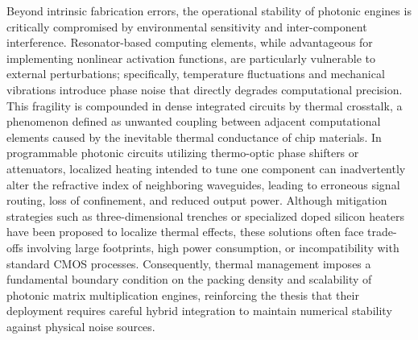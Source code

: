 Beyond intrinsic fabrication errors, the operational stability of photonic engines is critically compromised by environmental sensitivity and inter-component interference. Resonator-based computing elements, while advantageous for implementing nonlinear activation functions, are particularly vulnerable to external perturbations; specifically, temperature fluctuations and mechanical vibrations introduce phase noise that directly degrades computational precision. This fragility is compounded in dense integrated circuits by thermal crosstalk, a phenomenon defined as unwanted coupling between adjacent computational elements caused by the inevitable thermal conductance of chip materials. \citep{doi_10_1109_access_2020_3013116_8fec1fb2} In programmable photonic circuits utilizing thermo-optic phase shifters or attenuators, localized heating intended to tune one component can inadvertently alter the refractive index of neighboring waveguides, leading to erroneous signal routing, loss of confinement, and reduced output power. Although mitigation strategies such as three-dimensional trenches or specialized doped silicon heaters have been proposed to localize thermal effects, these solutions often face trade-offs involving large footprints, high power consumption, or incompatibility with standard CMOS processes. Consequently, thermal management imposes a fundamental boundary condition on the packing density and scalability of photonic matrix multiplication engines, reinforcing the thesis that their deployment requires careful hybrid integration to maintain numerical stability against physical noise sources. \citep{doi_10_3390_nano14080697_c372a140} \citep{doi_10_1109_access_2020_3013116_8fec1fb2}

